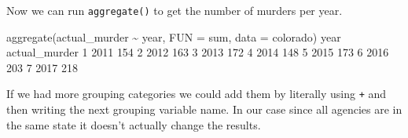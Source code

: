 \documentclass[
  12pt,
]{book}
\newenvironment{Shaded}{\begin{snugshade}}{\end{snugshade}}
\newcommand{\AttributeTok}[1]{\textcolor[rgb]{0.61,0.61,0.61}{#1}}
\newcommand{\DecValTok}[1]{\textcolor[rgb]{0.06,0.06,0.06}{#1}}
\newcommand{\FunctionTok}[1]{\textcolor[rgb]{0,0,0}{#1}}
\newcommand{\NormalTok}[1]{#1}
\newcommand{\OtherTok}[1]{\textcolor[rgb]{0.37,0.37,0.37}{#1}}
\newcommand{\SpecialCharTok}[1]{\textcolor[rgb]{0,0,0}{#1}}
\newcommand{\StringTok}[1]{\textcolor[rgb]{0.5,0.5,0.5}{#1}}
\begin{document}
\begin{Shaded}
\end{Shaded}

Now we can run \texttt{aggregate()} to get the number of murders per year.

\begin{Shaded}
\begin{Highlighting}[]
\FunctionTok{aggregate}\NormalTok{(actual\_murder }\SpecialCharTok{\textasciitilde{}}\NormalTok{ year, }\AttributeTok{FUN =}\NormalTok{ sum, }\AttributeTok{data =}\NormalTok{ colorado)}
\NormalTok{  year actual\_murder}
\DecValTok{1} \DecValTok{2011}           \DecValTok{154}
\DecValTok{2} \DecValTok{2012}           \DecValTok{163}
\DecValTok{3} \DecValTok{2013}           \DecValTok{172}
\DecValTok{4} \DecValTok{2014}           \DecValTok{148}
\DecValTok{5} \DecValTok{2015}           \DecValTok{173}
\DecValTok{6} \DecValTok{2016}           \DecValTok{203}
\DecValTok{7} \DecValTok{2017}           \DecValTok{218}
\end{Highlighting}
\end{Shaded}

If we had more grouping categories we could add them by literally using \texttt{+} and then writing the next grouping variable name. In our case since all agencies are in the same state it doesn't actually change the results.
\end{document}
